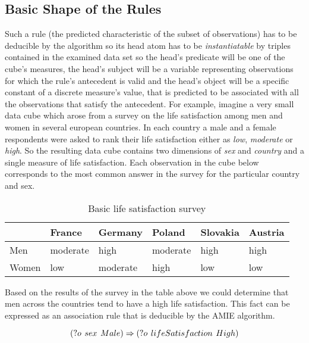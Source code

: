 \subsection{Basic Shape of the Rules}

Such a rule (the predicted characteristic of the subset of observations) has to be deducible by the algorithm so its head atom has to be \textit{instantiatable} by triples contained in the examined data set so the head's predicate will be one of the cube's measures, the head's subject will be a variable representing observations for which the rule's antecedent is valid and the head's object will be a specific constant of a discrete measure's value, that is predicted to be associated with all the observations that satisfy the antecedent. For example, imagine a very small data cube which arose from a survey on the life satisfaction among men and women in several european countries. In each country a male and a female respondents were asked to rank their life satisfaction either as \textit{low}, \textit{moderate} or \textit{high}. So the resulting data cube contains two dimensions of \textit{sex} and \textit{country} and a single measure of life satisfaction. Each observation in the cube below corresponds to the most common answer in the survey for the particular country and sex. 

\begin{table}[h]
\centering
\begin{tabular}{l|lllll}
    & France & Germany & Poland & Slovakia & Austria  \\ 
\hline
Men   & moderate     & high       & moderate      & high        & high        \\
Women & low      & moderate       & high      & low        & low       
\end{tabular}
\caption{Basic life satisfaction survey}\label{table1}
\end{table}


Based on the results of the survey in the table above we could determine that men across the countries tend to have a high life satisfaction. This fact can be expressed as an association rule that is deducible by the AMIE algorithm.

\begin{equation}\label{rule1}
    (?o\hspace{0.4em}sex\hspace{0.4em}Male) \Rightarrow (?o\hspace{0.4em}lifeSatisfaction\hspace{0.4em}High) 
\end{equation}


